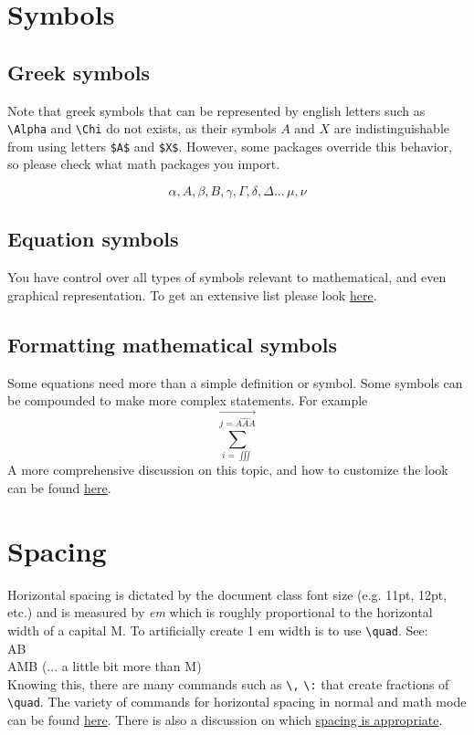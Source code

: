 \documentclass[12pt]{article}
\begin{document}

\section{Symbols}

\subsection*{Greek symbols}
Note that greek symbols that can be represented by english letters such as \verb!\Alpha! and \verb!\Chi! do not exists, as their symbols $A$ and $X$ are indistinguishable from using letters \verb!$A$! and \verb!$X$!. However, some packages override this behavior, so please check what math packages you import.

$$\alpha, A, \beta, B, \gamma, \Gamma, \delta, \Delta ...\, \mu, \nu $$

\subsection*{Equation symbols}
You have control over all types of symbols relevant to mathematical, and even graphical representation. To get an extensive list please look \href{https://en.wikibooks.org/wiki/LaTeX/Mathematics#List_of_mathematical_symbols}{here}.

\subsection*{Formatting mathematical symbols}
Some equations need more than a simple definition or symbol. Some symbols can be compounded to make more complex statements. For example
$$
\overrightarrow{\sum_{i=\iiint}^{j={\widehat{AAA}}}}
$$
A more comprehensive discussion on this topic, and how to customize the look can be found \href{https://en.wikibooks.org/wiki/LaTeX/Mathematics#Formatting_mathematics_symbols}{here}.

\section{Spacing}
Horizontal spacing is dictated by the document class font size (e.g. 11pt, 12pt, etc.) and is measured by \textit{em} which is roughly proportional to the horizontal width of a capital M. To artificially create 1 em width is to use \verb!\quad!. See: \\

\indent A{\quad}B\\
\indent AMB (... a little bit more than M)\\

Knowing this, there are many commands such as \verb!\,! \verb!\:! that create fractions of \verb!\quad!. The variety of commands for horizontal spacing in normal and math mode can be found \href{https://en.wikibooks.org/wiki/LaTeX/Mathematics#Controlling_horizontal_spacing}{here}. There is also a discussion on which \href{https://tex.stackexchange.com/questions/41476/lengths-and-when-to-use-them}{spacing is appropriate}.
\end{document}
